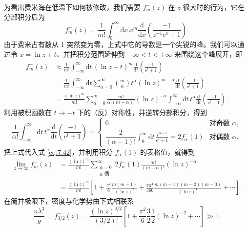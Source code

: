 

为看出费米海在低温下如何被修改，我们需要 $f_m^-(z)$ 在 $z$ 很大时的行为，它在分部积分后为
\begin{equation*}
f_m^-(z)=\frac1{m!}\int_0^\infty\mathrm dx\,x^m\frac{\mathrm d}{\mathrm dx}\left(\frac{-1}{z^{-1}\mathrm e^x+1}\right).
\end{equation*}
由于费米占有数从 1 突然变为零，上式中它的导数是一个尖锐的峰。我们可以通过令 $x=\ln z+t$、并把积分范围延伸到 $-\infty<t<+\infty$ 来围绕这个峰展开，即
\begin{equation}\label{eq:7.42}
\begin{aligned}
f_m^-(z)&\approx\frac1{m!}\int_{-\infty}^\infty\mathrm dt\,(\ln z+t)^m\frac{\mathrm d}{\mathrm dt}\left(\frac{-1}{\mathrm e^t+1}\right)\\
&=\frac1{m!}\int_{-\infty}^\infty\mathrm dt\sum_{\alpha=0}^\infty\binom m\alpha t^\alpha(\ln z)^{m-\alpha}\frac{\mathrm d}{\mathrm dt}\left(\frac{-1}{\mathrm e^t+1}\right)\\
&=\frac{(\ln z)^m}{m!}\sum_{\alpha=0}^\infty\frac{m!}{\alpha!(m-\alpha)!}(\ln z)^{-\alpha}\int_{-\infty}^\infty\mathrm dt\,t^\alpha\frac{\mathrm d}{\mathrm dt}\left(\frac{-1}{\mathrm e^t+1}\right).
\end{aligned}
\end{equation}
利用被积函数在 $t\to-t$ 下的（反）对称性，并逆转分部积分，得到
\begin{equation*}
\frac1{\alpha!}\int_{-\infty}^\infty\mathrm dt\,t^\alpha\frac{\mathrm d}{\mathrm dt}\left(\frac{-1}{\mathrm e^t+1}\right)=\begin{cases}0&\text{对奇数 }\alpha,\\[1ex] \dfrac2{(\alpha-1)!}\displaystyle\int_0^\infty\mathrm dt\,\frac{t^{\alpha-1}}{\mathrm e^t+1}=2f_\alpha^-(1)&\text{对偶数 }\alpha.\end{cases}
\end{equation*}
把上式代入式 \eqref{eq:7.42}，并利用积分 $f_\alpha^-(1)$ 的表格值，就得到 
\begin{equation}\label{eq:7.43}
\begin{aligned}
\lim_{z\to\infty}f_m^-(z)&=\frac{(\ln z)^m}{m!}\sum_{\substack{\alpha=0\\\alpha\text{ 偶}}}^\infty2f_\alpha^-(1)\frac{m!}{(m-\alpha)!}(\ln z)^{-\alpha}\\
&=\frac{(\ln z)^m}{m!}\left[1+\frac{\pi^2}6\frac{m(m-1)}{(\ln z)^2}+\frac{7\pi^4}{360}\frac{m(m-1)(m-2)(m-3)}{(\ln z)^4}+\cdots\right].
\end{aligned}
\end{equation}
在简并极限下，密度与化学势由下式相联系
\begin{equation}\label{eq:7.44}
\frac{n\lambda^3}g=f_{3/2}^-(z)=\frac{(\ln z)^{3/2}}{(3/2)!}\left[1+\frac{\pi^2}6\frac32\frac12(\ln z)^{-2}+\cdots\right]\gg1.
\end{equation}

